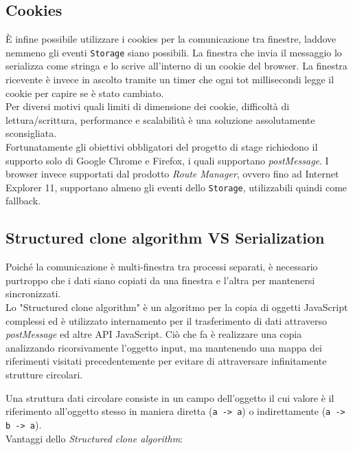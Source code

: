\subsection{Cookies}

È infine possibile utilizzare i cookies per la comunicazione tra finestre, laddove nemmeno gli eventi \texttt{Storage} siano possibili. La finestra che invia il messaggio lo serializza come stringa e lo scrive all'interno di un cookie del browser. La finestra ricevente è invece in ascolto tramite un timer che ogni tot millisecondi legge il cookie per capire se è stato cambiato. \\

Per diversi motivi quali limiti di dimensione dei cookie, difficoltà di lettura/scrittura, performance e scalabilità è una soluzione assolutamente sconsigliata. \\

Fortunatamente gli obiettivi obbligatori del progetto di stage richiedono il supporto solo di Google Chrome e Firefox, i quali supportano \textit{postMessage}. I browser invece supportati dal prodotto \textit{Route Manager}, ovvero fino ad Internet Explorer 11, supportano almeno gli eventi dello \texttt{Storage}, utilizzabili quindi come fallback.

\subsection{Structured clone algorithm VS Serialization}

Poiché la comunicazione è multi-finestra tra processi separati, è necessario purtroppo che i dati siano copiati da una finestra e l'altra per mantenersi sincronizzati. \\

Lo "Structured clone algorithm" è un algoritmo per la copia di oggetti JavaScript complessi ed è utilizzato internamento per il trasferimento di dati attraverso \textit{postMessage} ed altre API JavaScript. Ciò che fa è realizzare una copia analizzando ricorsivamente l'oggetto input, ma mantenendo una mappa dei riferimenti visitati precedentemente per evitare di attraversare infinitamente strutture circolari. 

Una struttura dati circolare consiste in un campo dell'oggetto il cui valore è il riferimento all'oggetto stesso in maniera diretta (\texttt{a -> a}) o indirettamente (\texttt{a -> b -> a}). \\

Vantaggi dello \textit{Structured clone algorithm}:


